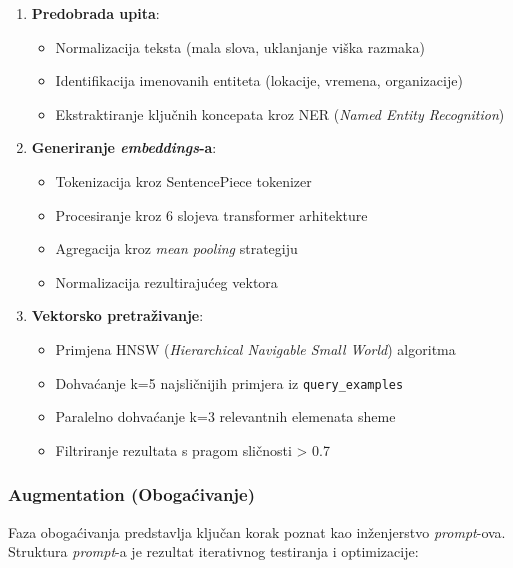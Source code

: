 \begin{enumerate}
    \item \textbf{Predobrada upita}:
    \begin{itemize}
        \item Normalizacija teksta (mala slova, uklanjanje viška razmaka)
        \item Identifikacija imenovanih entiteta (lokacije, vremena, organizacije)
        \item Ekstraktiranje ključnih koncepata kroz NER (\textit{Named Entity Recognition})
    \end{itemize}
    
    \item \textbf{Generiranje \textit{embeddings}-a}:
    \begin{itemize}
        \item Tokenizacija kroz SentencePiece tokenizer
        \item Procesiranje kroz 6 slojeva transformer arhitekture
        \item Agregacija kroz \textit{mean pooling} strategiju
        \item Normalizacija rezultirajućeg vektora
    \end{itemize}
    
    \item \textbf{Vektorsko pretraživanje}:
    \begin{itemize}
        \item Primjena HNSW (\textit{Hierarchical Navigable Small World}) algoritma
        \item Dohvaćanje k=5 najsličnijih primjera iz \texttt{query\_examples}
        \item Paralelno dohvaćanje k=3 relevantnih elemenata sheme
        \item Filtriranje rezultata s pragom sličnosti > 0.7
    \end{itemize}
\end{enumerate}

\subsubsection{Augmentation (Obogaćivanje)}

Faza obogaćivanja predstavlja ključan korak poznat kao inženjerstvo \textit{prompt}-ova. Struktura \textit{prompt}-a je rezultat iterativnog testiranja i optimizacije:

